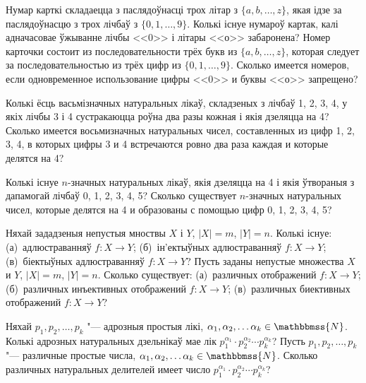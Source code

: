 \begin{problemList}
\bigskip

\problemItemSimple
{Нумар карткі складаецца з паслядоўнасці трох літар з  $\{a, b, \dots, z \}$, якая ідзе за паслядоўнасцю з трох лічбаў з $\{0, 1, \dots, 9 \}$. Колькі існуе нумароў картак, калі адначасовае ўжыванне лічбы <<0>> і літары <<о>> забаронена?}
{Номер карточки состоит из последовательности трёх букв из $\{a, b, \dots, z \}$, которая следует за последовательностью из трёх цифр из $\{0, 1, \dots, 9 \}$. Сколько имеется номеров, если одновременное использование цифры <<0>> и буквы <<о>> запрещено?}

\bigskip

\problemItemSimple
{Колькі ёсць васьмізначных натуральных лікаў, складзеных з лічбаў 1, 2, 3, 4, у якіх лічбы 3 і 4 сустракаюцца роўна два разы кожная і якія дзеляцца на 4?}
{Сколько имеется восьмизначных натуральных чисел, составленных из цифр 1, 2, 3, 4, в которых цифры 3 и 4 встречаются ровно два раза каждая и которые делятся на 4?}

\bigskip

\problemItemSimple
{Колькі існуе $n$-значных натуральных лікаў, якія дзеляцца на 4 і якія ўтвораныя з дапамогай лічбаў 0, 1, 2, 3, 4, 5?}
{Сколько существует $n$-значных натуральных чисел, которые делятся на 4 и образованы с помощью цифр 0, 1, 2, 3, 4, 5?}

\bigskip

\problemItemSimple
{Няхай зададзеныя непустыя мноствы $X$ і $Y$, $|X|=m$, $|Y|=n$. Колькі існуе: (а)~адлюстраванняў $f : X \rightarrow Y$; (б)~ін'ектыўных адлюстраванняў $f : X \rightarrow Y$; (в)~біектыўных адлюстраванняў $f : X \rightarrow Y$?}
{Пусть заданы непустые множества $X$ и $Y$, $|X|=m$, $|Y|=n$. Сколько существует: (а)~различных отображений $f : X \rightarrow Y$; (б)~различных инъективных отображений $f : X \rightarrow Y$; (в)~различных биективных отображений $f : X \rightarrow Y$?}

\bigskip

\problemItemSimple
{Няхай $p_{1}, p_{2}, \dots, p_{k}$ "--- адрозныя простыя лікі, $\alpha_{1}, \alpha_{2}, \dots \alpha_{k} \in \mathbbmss{N}$. Колькі адрозных натуральных дзельнікаў мае лік $p_{1} ^{\alpha_{1}} \cdot p_{2} ^{\alpha_{2}} \cdots p_{k} ^{\alpha_{k}}$?}
{Пусть $p_{1}, p_{2}, \dots, p_{k}$ "--- различные простые числа, $\alpha_{1}, \alpha_{2}, \dots \alpha_{k} \in \mathbbmss{N}$. Сколько различных натуральных делителей имеет число $p_{1} ^{\alpha_{1}} \cdot p_{2} ^{\alpha_{2}} \cdots p_{k} ^{\alpha_{k}}$?}

\bigskip


\end{problemList}
